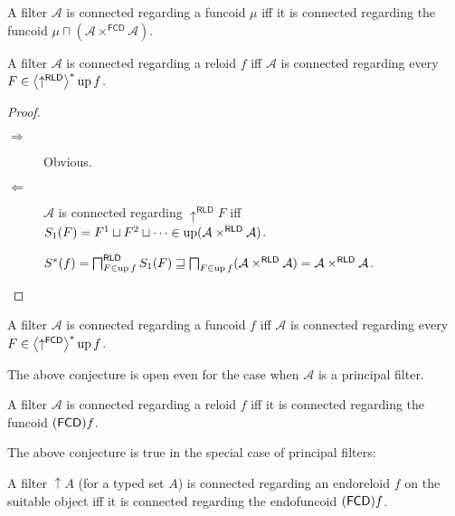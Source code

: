\begin{obvious}
A filter $\mathcal{A}$ is connected regarding a funcoid $\mu$ iff
it is connected regarding the funcoid $\mu\sqcap(\mathcal{A}\times^{\mathsf{FCD}}\mathcal{A})$.\end{obvious}
\begin{thm}
A filter $\mathcal{A}$ is connected regarding a reloid $f$ iff $\mathcal{A}$
is connected regarding every $F\in\left\langle \uparrow^{\mathsf{RLD}}\right\rangle ^{\ast}\operatorname{up} f$.\end{thm}
\begin{proof}
~
\begin{description}
\item [{$\Rightarrow$}] Obvious.
\item [{$\Leftarrow$}] $\mathcal{A}$ is connected regarding $\uparrow^{\mathsf{RLD}}F$
iff $S_1(F)=F^{1}\sqcup F^{2}\sqcup\dots\in\operatorname{up}(\mathcal{A}\times^{\mathsf{RLD}}\mathcal{A})$.


$S^{\ast}(f)=\bigsqcap_{F\in\operatorname{up} f}^{\mathsf{RLD}}S_1(F)\sqsupseteq\bigsqcap_{F\in\operatorname{up} f}(\mathcal{A}\times^{\mathsf{RLD}}\mathcal{A})=\mathcal{A}\times^{\mathsf{RLD}}\mathcal{A}$.

\end{description}
\end{proof}
\begin{conjecture}
A filter $\mathcal{A}$ is connected regarding a funcoid $f$ iff
$\mathcal{A}$ is connected regarding every $F\in\left\langle \uparrow^{\mathsf{FCD}}\right\rangle ^{\ast}\operatorname{up} f$.
\end{conjecture}
The above conjecture is open even for the case when $\mathcal{A}$
is a principal filter.
\begin{conjecture}
A filter $\mathcal{A}$ is connected regarding a reloid $f$ iff it
is connected regarding the funcoid $(\mathsf{FCD}) f$.
\end{conjecture}
The above conjecture is true in the special case of principal filters:
\begin{prop}
A filter $\uparrow A$ (for a typed set $A$) is connected regarding
an endoreloid $f$ on the suitable object iff it is connected regarding the endofuncoid $(\mathsf{FCD}) f$.\end{prop}
